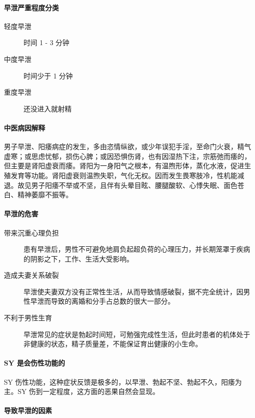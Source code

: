 \documentclass{ctexart}
\begin{document}
\paragraph{早泄严重程度分类}

\begin{description}
    \item[轻度早泄] 时间 1 - 3 分钟
    \item[中度早泄] 时间少于 1 分钟
    \item[重度早泄] 还没进入就射精
\end{description}

\paragraph{中医病因解释}

男子早泄、阳痿病症的发生，多由恣情纵欲，或少年误犯手淫，至命门火衰，精气虚寒；或思虑忧郁，损伤心脾；或因恐惧伤肾，也有因湿热下注，宗筋弛而痿的，但主要是肾阳虚衰而痿。肾阳为一身阳气之根本，有温煦形体，蒸化水液，促进生殖发育等功能。肾阳虚衰则温煦失职，气化无权。因而发生畏寒肢冷，性机能减退。故见男子阳痿不举或不坚，且伴有头晕目眩、腰腿酸软、心悸失眠、面色苍白、精神萎靡不振等。

\paragraph{早泄的危害}

\begin{description}
    \item[带来沉重心理负担] 患有早泄后，男性不可避免地肩负起超负荷的心理压力，并长期笼罩于疾病的阴影之下，工作、生活大受影响。
    \item[造成夫妻关系破裂] 早泄使夫妻双方没有正常性生活，从而导致情感破裂，据不完全统计，因男性早泄而导致的离婚和分手占总数的很大一部分。
    \item[不利于男性生育] 早泄常见的症状是勃起时间短，可勉强完成性生活，但此时患者的机体处于非健康的状态，精子质量差，不能保证育出健康的小生命。
\end{description}

\paragraph{SY 是会伤性功能的}

SY 伤性功能，这种症状反馈是极多的，以早泄、勃起不坚、勃起不久，阳痿为主。SY 伤到一定程度，这方面的恶果自然会显现。

\paragraph{导致早泄的因素}
\end{document}
